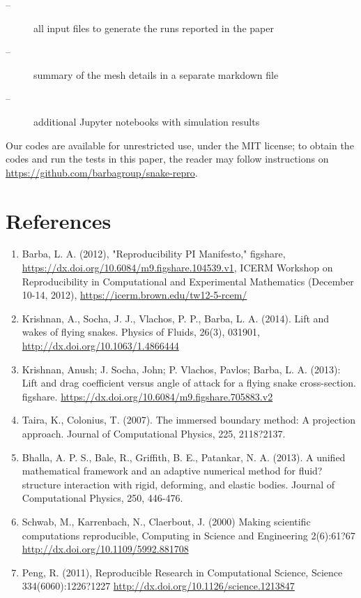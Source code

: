 \documentclass[9pt,twocolumn,twoside]{article}
\newlength{\up}
\begin{document}
\begin{description}
 \item[ --]   all input files to generate the runs reported in the paper
 \item[ --] summary of the mesh details in a separate markdown file
 \item[ --] additional Jupyter notebooks with simulation results
\end{description}


Our codes are available for unrestricted use, under the MIT license; to obtain the codes and run the tests in this paper, the reader may follow instructions on \url{https://github.com/barbagroup/snake-repro}.
 

\section*{References}
{\footnotesize
\begin{enumerate}
\item Barba, L. A. (2012), "Reproducibility PI Manifesto," figshare, \url{https://dx.doi.org/10.6084/m9.figshare.104539.v1}, ICERM Workshop on Reproducibility in Computational and Experimental Mathematics (December 10-14, 2012), \url{https://icerm.brown.edu/tw12-5-rcem/} 

\item Krishnan, A., Socha, J. J., Vlachos, P. P., Barba, L. A. (2014). Lift and wakes of flying snakes. Physics of Fluids, 26(3), 031901, \url{http://dx.doi.org/10.1063/1.4866444}

\item Krishnan, Anush; J. Socha, John; P. Vlachos, Pavlos; Barba, L. A. (2013): Lift and drag coefficient versus angle of attack for a flying snake cross-section. figshare. \url{https://dx.doi.org/10.6084/m9.figshare.705883.v2}

\item Taira, K., Colonius, T. (2007). The immersed boundary method: A projection approach. Journal of Computational Physics, 225, 2118?2137.

\item Bhalla, A. P. S., Bale, R., Griffith, B. E., Patankar, N. A. (2013). A unified mathematical framework and an adaptive numerical method for fluid?structure interaction with rigid, deforming, and elastic bodies. Journal of Computational Physics, 250, 446-476.

\item Schwab, M., Karrenbach, N., Claerbout, J. (2000) Making scientific computations reproducible, Computing in Science and Engineering 2(6):61?67 \url{http://dx.doi.org/10.1109/5992.881708}

\item Peng, R. (2011), Reproducible Research in Computational Science, Science 334(6060):1226?1227 \url{http://dx.doi.org/10.1126/science.1213847}

\end{enumerate}
}
\end{document}
